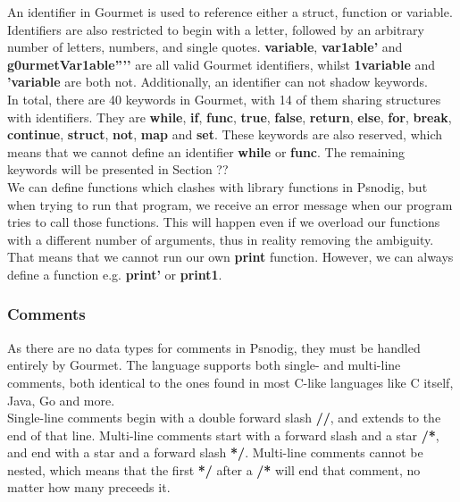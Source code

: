 An identifier in Gourmet is used to reference either a struct, function or variable. Identifiers are also restricted to begin with a letter, followed by an arbitrary number of letters, numbers, and single quotes. \textbf{variable}, \textbf{var1able’} and \textbf{g0urmetVar1able''’'} are all valid Gourmet identifiers, whilst \textbf{1variable} and \textbf{'variable} are both not. Additionally, an identifier can not shadow keywords. \hfill \\

In total, there are 40 keywords in Gourmet, with 14 of them sharing structures with identifiers. They are \textbf{while}, \textbf{if}, \textbf{func}, \textbf{true}, \textbf{false}, \textbf{return}, \textbf{else}, \textbf{for}, \textbf{break}, \textbf{continue}, \textbf{struct}, \textbf{not}, \textbf{map} and \textbf{set}. These keywords are also reserved, which means that we cannot define an identifier \textbf{while} or \textbf{func}. The remaining keywords will be presented in Section ?? \hfill \\

We can define functions which clashes with library functions in Psnodig, but when trying to run that program, we receive an error message when our program tries to call those functions. This will happen even if we overload our functions with a different number of arguments, thus in reality removing the ambiguity. That means that we cannot run our own \textbf{print} function. However, we can always define a function e.g. \textbf{print’} or \textbf{print1}. \hfill \\

\subsubsection{Comments}

As there are no data types for comments in Psnodig, they must be handled entirely by Gourmet. The language supports both single- and multi-line comments, both identical to the ones found in most C-like languages like C itself, Java, Go and more. \hfill \\

Single-line comments begin with a double forward slash \textbf{//}, and extends to the end of that line. Multi-line comments start with a forward slash and a star \textbf{/*}, and end with a star and a forward slash \textbf{*/}. Multi-line comments cannot be nested, which means that the first \textbf{*/} after a \textbf{/*} will end that comment, no matter how many \textbf{\*} preceeds it. \hfill \\

